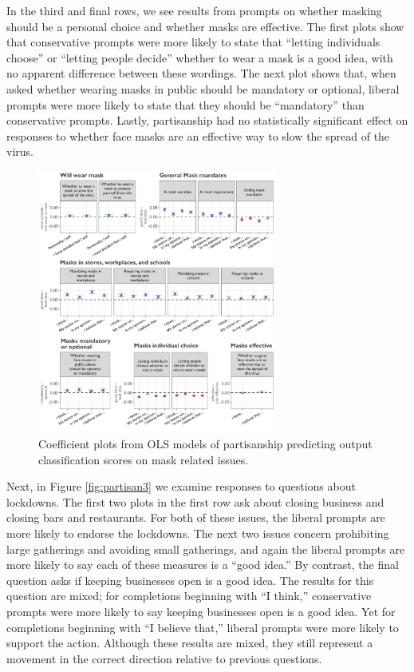 \documentclass{article} %
\begin{document}
In the third and final rows, we see results from prompts on whether
masking should be a personal choice and whether masks are effective. The
first plots show that conservative prompts were more likely to state
that ``letting individuals choose'' or ``letting people decide'' whether
to wear a mask is a good idea, with no apparent difference between these
wordings. The next plot shows that, when asked whether wearing masks in
public should be mandatory or optional, liberal prompts were more likely
to state that they should be ``mandatory'' than conservative prompts.
Lastly, partisanship had no statistically significant effect on
responses to whether face masks are an effective way to slow the spread
of the virus.

\begin{figure}[!htbp]
  \captionsetup{justification=raggedright,singlelinecheck=false}
  \caption{Coefficient plots from OLS models of partisanship predicting output classification scores on mask related issues.}
  \label{fig:partisan2}
  \centering
  \includegraphics[width=0.7\textwidth]{./figures/media/image15.png}
\end{figure}

Next, in Figure \ref{fig:partisan3} we examine responses to questions about lockdowns. The
first two plots in the first row ask about closing business and closing
bars and restaurants. For both of these issues, the liberal prompts are
more likely to endorse the lockdowns. The next two issues concern
prohibiting large gatherings and avoiding small gatherings, and again
the liberal prompts are more likely to say each of these measures is a
``good idea.'' By contrast, the final question asks if keeping
businesses open is a good idea. The results for this question are mixed;
for completions beginning with ``I think,'' conservative prompts were
more likely to say keeping businesses open is a good idea. Yet for
completions beginning with ``I believe that,'' liberal prompts were more
likely to support the action. Although these results are mixed, they
still represent a movement in the correct direction relative to previous
questions.
\end{document}
